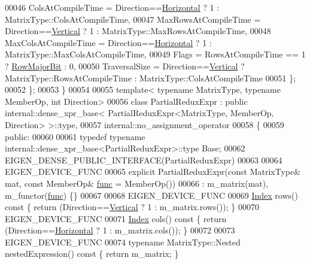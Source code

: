 \begin{DoxyCode}
00046     ColsAtCompileTime = Direction==\hyperlink{group__enums_ggad49a7b3738e273eb00932271b36127f7aae8a16b3b9272683c1162915f6d892be}{Horizontal} ? 1 : MatrixType::ColsAtCompileTime,
00047     MaxRowsAtCompileTime = Direction==\hyperlink{group__enums_ggad49a7b3738e273eb00932271b36127f7addca718e0564723df21d61b94b1198be}{Vertical}   ? 1 : MatrixType::MaxRowsAtCompileTime,
00048     MaxColsAtCompileTime = Direction==\hyperlink{group__enums_ggad49a7b3738e273eb00932271b36127f7aae8a16b3b9272683c1162915f6d892be}{Horizontal} ? 1 : MatrixType::MaxColsAtCompileTime,
00049     Flags = RowsAtCompileTime == 1 ? \hyperlink{group__flags_gae4f56c2a60bbe4bd2e44c5b19cbe8762}{RowMajorBit} : 0,
00050     TraversalSize = Direction==\hyperlink{group__enums_ggad49a7b3738e273eb00932271b36127f7addca718e0564723df21d61b94b1198be}{Vertical} ? MatrixType::RowsAtCompileTime :  
      MatrixType::ColsAtCompileTime
00051   \};
00052 \};
00053 \}
00054 
00055 \textcolor{keyword}{template}< \textcolor{keyword}{typename} MatrixType, \textcolor{keyword}{typename} MemberOp, \textcolor{keywordtype}{int} Direction>
00056 \textcolor{keyword}{class }PartialReduxExpr : \textcolor{keyword}{public} internal::dense\_xpr\_base< PartialReduxExpr<MatrixType, MemberOp, Direction>
       >::type,
00057                          internal::no\_assignment\_operator
00058 \{
00059   \textcolor{keyword}{public}:
00060 
00061     \textcolor{keyword}{typedef} \textcolor{keyword}{typename} internal::dense\_xpr\_base<PartialReduxExpr>::type Base;
00062     EIGEN\_DENSE\_PUBLIC\_INTERFACE(PartialReduxExpr)
00063 
00064     EIGEN\_DEVICE\_FUNC
00065     \textcolor{keyword}{explicit} PartialReduxExpr(\textcolor{keyword}{const} MatrixType& mat, \textcolor{keyword}{const} MemberOp& \hyperlink{structfunc}{func} = MemberOp())
00066       : m\_matrix(mat), m\_functor(\hyperlink{structfunc}{func}) \{\}
00067 
00068     EIGEN\_DEVICE\_FUNC
00069     \hyperlink{namespace_eigen_a62e77e0933482dafde8fe197d9a2cfde}{Index} rows()\textcolor{keyword}{ const }\{ \textcolor{keywordflow}{return} (Direction==\hyperlink{group__enums_ggad49a7b3738e273eb00932271b36127f7addca718e0564723df21d61b94b1198be}{Vertical}   ? 1 : m\_matrix.rows()); \}
00070     EIGEN\_DEVICE\_FUNC
00071     \hyperlink{namespace_eigen_a62e77e0933482dafde8fe197d9a2cfde}{Index} cols()\textcolor{keyword}{ const }\{ \textcolor{keywordflow}{return} (Direction==\hyperlink{group__enums_ggad49a7b3738e273eb00932271b36127f7aae8a16b3b9272683c1162915f6d892be}{Horizontal} ? 1 : m\_matrix.cols()); \}
00072 
00073     EIGEN\_DEVICE\_FUNC
00074     \textcolor{keyword}{typename} MatrixType::Nested nestedExpression()\textcolor{keyword}{ const }\{ \textcolor{keywordflow}{return} m\_matrix; \}

\end{DoxyCode}
